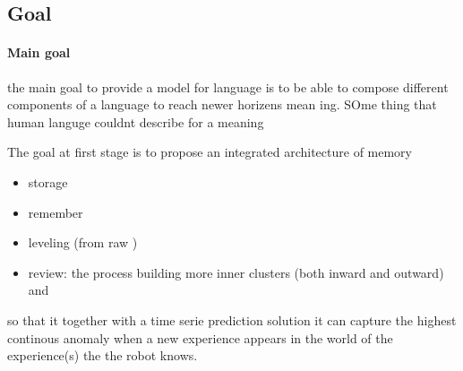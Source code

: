 \subsection{Goal}
\paragraph{Main goal}
    the main goal to provide a model for language is to be able to compose different components of a language to reach newer horizens mean ing. SOme thing that human languge couldnt describe for a meaning

The goal at first stage is to propose an integrated architecture of memory
\begin{itemize}
    \item storage
    \item remember
    \item leveling (from raw )
    \item review: the process building more inner clusters (both inward and outward) and
\end{itemize}
so that it together with a time serie prediction solution it can capture the highest continous anomaly when a new experience appears in the world of the experience(s) the the robot knows.